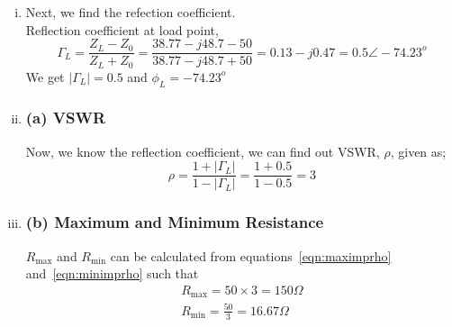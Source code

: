 \begin{exmp}
\begin{enumerate}[(i)]
\item Next, we find the refection coefficient.\\
Reflection coefficient at load point,
\begin{dmath*}
\Gamma_{L}=\frac{Z_{L}-Z_{0}}{Z_{L}+Z_{0}}
= \frac{38.77-j48.7-50}{38.77-j48.7+50}
=0.13-j0.47 = 0.5\angle-74.23^o
\end{dmath*}
We get $|\Gamma_{L}|=0.5$ and $\phi_L = -74.23^o$

\item 
\subsubsection*{(a) VSWR}
Now, we know the reflection coefficient, we can find out VSWR, $\rho$, given as;
\begin{dmath*}
\rho=\frac{1 + |\Gamma_{L}|}{1-|\Gamma_{L}|}=\frac{1+0.5}{1-0.5} = 3
\end{dmath*}

\item 
\subsubsection*{(b) Maximum and Minimum Resistance}
$R_\max$ and $R_\min$ can be calculated from equations~\eqref{eqn:maximprho} and~\eqref{eqn:minimprho} such that
\begin{align*}
R_\max = 50 \times 3 = 150\Omega\\
R_\min = \frac{50}{3} = 16.67\Omega
\end{align*}
\end{enumerate}
\end{exmp}

